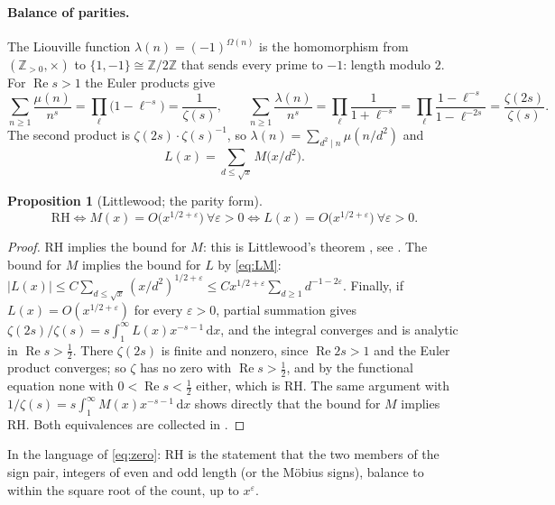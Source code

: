 \documentclass[11pt]{article}
\newtheorem{proposition}[theorem]{Proposition}
\theoremstyle{definition}\newtheorem{definition}[theorem]{Definition}
\theoremstyle{remark}\newtheorem{remark}[theorem]{Remark}
\newcommand{\dd}{\,\mathrm d}\newcommand{\e}{\mathrm e}
\renewcommand{\Re}{\operatorname{Re}}\renewcommand{\Im}{\operatorname{Im}}
\begin{document}
\paragraph{Balance of parities.} The Liouville function $\lambda(n)=(-1)^{\Omega(n)}$ is the homomorphism from $(\mathbb Z_{>0},\times)$ to $\{1,-1\}\cong\mathbb Z/2\mathbb Z$ that sends every prime to $-1$: length modulo $2$. For $\Re s>1$ the Euler products give
\[
\sum_{n\ge1}\frac{\mu(n)}{n^s}=\prod_\ell\bigl(1-\ell^{-s}\bigr)=\frac1{\zeta(s)},\qquad \sum_{n\ge1}\frac{\lambda(n)}{n^s}=\prod_\ell\frac1{1+\ell^{-s}}=\prod_\ell\frac{1-\ell^{-s}}{1-\ell^{-2s}}=\frac{\zeta(2s)}{\zeta(s)} .
\]
The second product is $\zeta(2s)\cdot\zeta(s)^{-1}$, so $\lambda(n)=\sum_{d^2\mid n}\mu(n/d^2)$ and
\begin{equation}\label{eq:LM}
L(x)=\sum_{d\le\sqrt x}M\bigl(x/d^2\bigr).
\end{equation}
\begin{proposition}[Littlewood; the parity form]\label{prop:RH}
\begin{equation}\label{eq:RH}
\mathrm{RH}\iff M(x)=O\bigl(x^{1/2+\varepsilon}\bigr)\ \forall\varepsilon>0\iff L(x)=O\bigl(x^{1/2+\varepsilon}\bigr)\ \forall\varepsilon>0 .
\end{equation}
\end{proposition}
\begin{proof}
RH implies the bound for $M$: this is Littlewood's theorem \cite{Littlewood}, see \cite[\S14.25]{Titchmarsh}. The bound for $M$ implies the bound for $L$ by \eqref{eq:LM}: $|L(x)|\le C\sum_{d\le\sqrt x}(x/d^2)^{1/2+\varepsilon}\le Cx^{1/2+\varepsilon}\sum_{d\ge1}d^{-1-2\varepsilon}$. Finally, if $L(x)=O(x^{1/2+\varepsilon})$ for every $\varepsilon>0$, partial summation gives $\zeta(2s)/\zeta(s)=s\int_1^\infty L(x)x^{-s-1}\dd x$, and the integral converges and is analytic in $\Re s>\tfrac12$. There $\zeta(2s)$ is finite and nonzero, since $\Re 2s>1$ and the Euler product converges; so $\zeta$ has no zero with $\Re s>\tfrac12$, and by the functional equation none with $0<\Re s<\tfrac12$ either, which is RH. The same argument with $1/\zeta(s)=s\int_1^\infty M(x)x^{-s-1}\dd x$ shows directly that the bound for $M$ implies RH. Both equivalences are collected in \cite{Borwein}.
\end{proof}
In the language of \eqref{eq:zero}: RH is the statement that the two members of the sign pair, integers of even and odd length (or the M\"obius signs), balance to within the square root of the count, up to $x^{\varepsilon}$.
\end{document}
